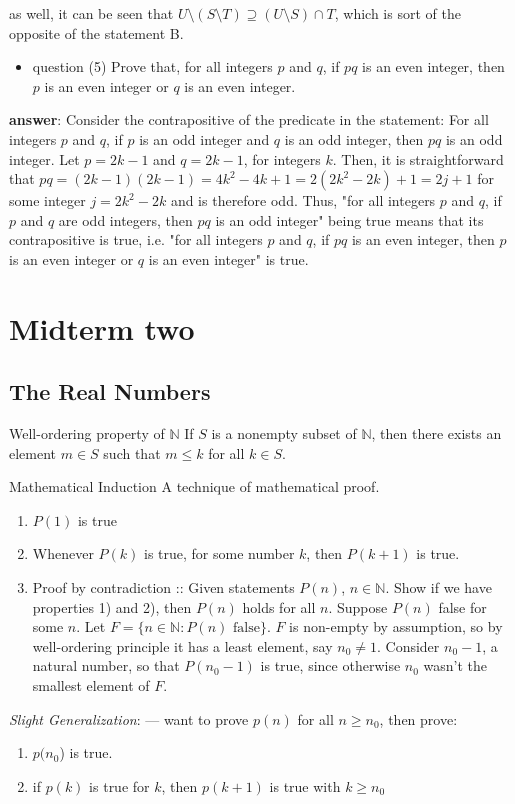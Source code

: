 \documentclass[12pt]{article}
\newcommand\Natural{\mathbb{N}}
\newcommand\supe{\supseteq}
\begin{document}
as well, it can be seen that \(U\setminus(S\setminus{}T)\supe(U\setminus{}S)\cap{}T\), which is sort of the opposite of
the statement B.
\begin{itemize}
\item question (5) Prove that, for all integers \(p\) and \(q\), if \(pq\) is an even
integer, then \(p\) is an even integer or \(q\) is an even integer.
\end{itemize}
\textbf{answer}: Consider the contrapositive of the predicate in the statement: For all
integers \(p\) and \(q\), if \(p\) is an odd integer and \(q\) is an odd integer, then
\(pq\) is an odd integer. Let \(p=2k-1\) and \(q=2k-1\), for integers \(k\). Then, it is
straightforward that \(pq=(2k-1)(2k-1)=4k^{2}-4k+1=2(2k^{2}-2k)+1=2j+1\) for some
integer \(j=2k^{2}-2k\) and is therefore odd. Thus, "for all integers \(p\) and \(q\), if
\(p\) and \(q\) are odd integers, then \(pq\) is an odd integer" being true means that
its contrapositive is true, i.e. "for all integers \(p\) and \(q\), if \(pq\) is an
even integer, then \(p\) is an even integer or \(q\) is an even integer" is true.
\section{Midterm two}
\label{sec:org3077b31}
\subsection{The Real Numbers}
\label{sec:orgc97beae}
\begin{definition}{Well-ordering property of $\Natural$}
  If $S$ is a nonempty subset of $\Natural$, then there exists an element $m \in
  S$ such that $m \le k$ for all $k \in S$.
\end{definition}

\begin{definition}{Mathematical Induction}
  A technique of mathematical proof.
  \begin{enumerate}
  \item $P(1)$ is true
  \item Whenever $P(k)$ is true, for some number $k$, then $P(k+1)$ is true.
  \item Proof by contradiction :: Given statements $P(n)$, $n\in\Natural$. Show
    if we have properties 1) and 2), then $P(n)$ holds for all $n$. Suppose
    $P(n)$ false for some $n$. Let $F=\{n\in\Natural : P(n) \text{ false}\}$.
    $F$ is non-empty by assumption, so by well-ordering principle it has a least
    element, say $n_{0}\ne{}1$. Consider $n_{0}-1$, a natural number, so that
    $P(n_{0}-1)$ is true, since otherwise $n_{0}$ wasn't the smallest element of
    $F$.
  \end{enumerate}
  \textit{Slight Generalization}: --- want to prove $p(n)$ for all $n\ge n_0$,
  then prove:
  \begin{enumerate}
     \item $p(n_0$) is true.
     \item if $p(k)$ is true for $k$, then $p(k+1)$ is true with $k\ge n_0$
  \end{enumerate}
\end{definition}
\end{document}
